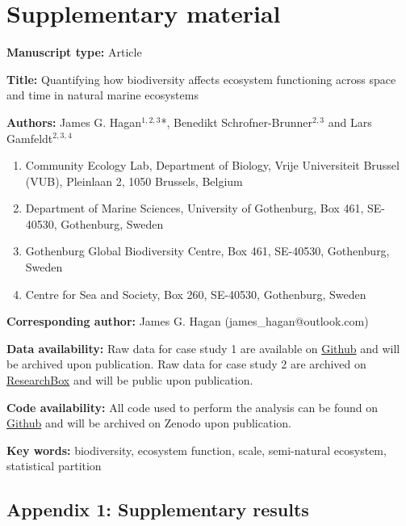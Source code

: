 \documentclass[
  letterpaper,
  DIV=11,
  numbers=noendperiod]{scrartcl}
\author{}
\date{}
\providecommand{\tightlist}{%
  \setlength{\itemsep}{0pt}\setlength{\parskip}{0pt}}\usepackage{longtable,booktabs,array}
\begin{document}
\section{Supplementary material}\label{supplementary-material}

\textbf{Manuscript type:} Article

\textbf{Title:} Quantifying how biodiversity affects ecosystem
functioning across space and time in natural marine ecosystems

\textbf{Authors:} James G. Hagan\(^{1, 2, 3}\)*, Benedikt
Schrofner-Brunner\(^{2, 3}\) and Lars Gamfeldt\(^{2, 3, 4}\)

\begin{enumerate}
\def\labelenumi{\arabic{enumi}.}
\tightlist
\item
  Community Ecology Lab, Department of Biology, Vrije Universiteit
  Brussel (VUB), Pleinlaan 2, 1050 Brussels, Belgium\\
\item
  Department of Marine Sciences, University of Gothenburg, Box 461,
  SE-40530, Gothenburg, Sweden\\
\item
  Gothenburg Global Biodiversity Centre, Box 461, SE-40530, Gothenburg,
  Sweden\\
\item
  Centre for Sea and Society, Box 260, SE-40530, Gothenburg, Sweden
\end{enumerate}

\textbf{Corresponding author:} James G. Hagan (james\_hagan@outlook.com)

\textbf{Data availability:} Raw data for case study 1 are available on
\href{https://github.com/haganjam/BEF_quant_scale}{Github} and will be
archived upon publication. Raw data for case study 2 are archived on
\href{https://researchbox.org/843&PEER_REVIEW_passcode=GLGJFF}{ResearchBox}
and will be public upon publication.

\textbf{Code availability:} All code used to perform the analysis can be
found on \href{https://github.com/haganjam/BEF_quant_scale}{Github} and
will be archived on Zenodo upon publication.

\textbf{Key words:} biodiversity, ecosystem function, scale,
semi-natural ecosystem, statistical partition

\subsection{Appendix 1: Supplementary
results}\label{appendix-1-supplementary-results}
\end{document}
